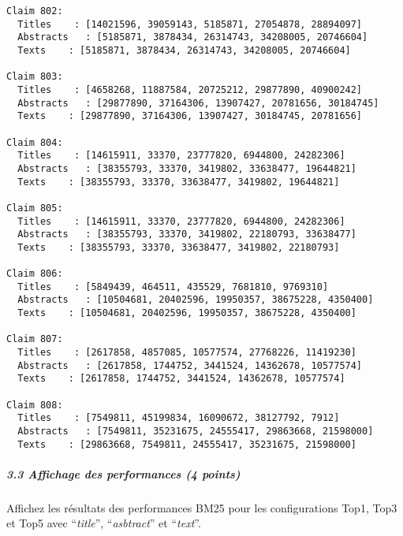 \documentclass[11pt]{article}
\begin{document}
\begin{Verbatim}[commandchars=\\\{\}]
Claim 802:
  Titles    : [14021596, 39059143, 5185871, 27054878, 28894097]
  Abstracts   : [5185871, 3878434, 26314743, 34208005, 20746604]
  Texts    : [5185871, 3878434, 26314743, 34208005, 20746604]

Claim 803:
  Titles    : [4658268, 11887584, 20725212, 29877890, 40900242]
  Abstracts   : [29877890, 37164306, 13907427, 20781656, 30184745]
  Texts    : [29877890, 37164306, 13907427, 30184745, 20781656]

Claim 804:
  Titles    : [14615911, 33370, 23777820, 6944800, 24282306]
  Abstracts   : [38355793, 33370, 3419802, 33638477, 19644821]
  Texts    : [38355793, 33370, 33638477, 3419802, 19644821]

Claim 805:
  Titles    : [14615911, 33370, 23777820, 6944800, 24282306]
  Abstracts   : [38355793, 33370, 3419802, 22180793, 33638477]
  Texts    : [38355793, 33370, 33638477, 3419802, 22180793]

Claim 806:
  Titles    : [5849439, 464511, 435529, 7681810, 9769310]
  Abstracts   : [10504681, 20402596, 19950357, 38675228, 4350400]
  Texts    : [10504681, 20402596, 19950357, 38675228, 4350400]

Claim 807:
  Titles    : [2617858, 4857085, 10577574, 27768226, 11419230]
  Abstracts   : [2617858, 1744752, 3441524, 14362678, 10577574]
  Texts    : [2617858, 1744752, 3441524, 14362678, 10577574]

Claim 808:
  Titles    : [7549811, 45199834, 16090672, 38127792, 7912]
  Abstracts   : [7549811, 35231675, 24555417, 29863668, 21598000]
  Texts    : [29863668, 7549811, 24555417, 35231675, 21598000]

    \end{Verbatim}

    \subparagraph{3.3 Affichage des performances (4
points)}\label{affichage-des-performances-4-points}

Affichez les résultats des performances BM25 pour les configurations
Top1, Top3 et Top5 avec ``\emph{title}'', ``\emph{asbtract}'' et
``\emph{text}''.
\end{document}
